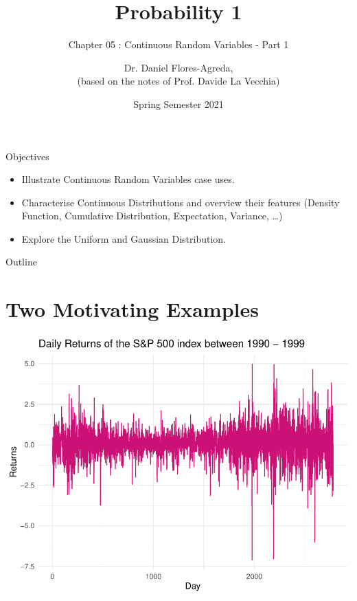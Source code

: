 \documentclass[notes=show,smaller]{beamer}\usepackage[]{graphicx}\usepackage[]{color}
\newenvironment{knitrout}{}{} %
\begin{document}
\title[S110015]{Probability 1}
\subtitle{Chapter 05 : Continuous Random Variables - Part 1}
\author[Flores-Agreda, La Vecchia]{Dr. Daniel Flores-Agreda, \\[0.5em] \tiny{(based on the notes of Prof. Davide La Vecchia)}}
\date{Spring Semester 2021}

\begin{frame}
\titlepage
\end{frame}


\begin{frame}{Objectives}
  \begin{itemize}
  \item Illustrate Continuous Random Variables case uses.
  \bigskip
  \item Characterise Continuous Distributions and overview their features (Density Function, Cumulative Distribution, Expectation, Variance, \dots)
  \bigskip
  \item Explore the Uniform and Gaussian Distribution.
  \bigskip
  \end{itemize}
\end{frame}

\begin{frame}{Outline}
  \tableofcontents
\end{frame}

\section{Two Motivating Examples}



\begin{frame}{\secname}
  \begin{example}
\begin{knitrout}
\color{fgcolor}

{\centering \includegraphics[width=0.5\linewidth]{figure/unnamed-chunk-2-1} 

}



\end{knitrout}
  \end{example}
\end{frame}
\end{document}
